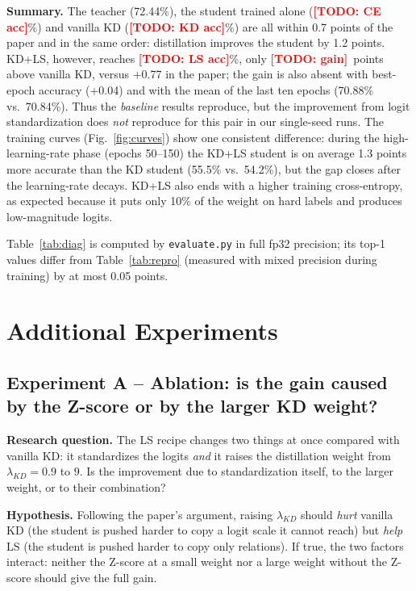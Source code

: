 \documentclass[12pt,a4paper]{article}
\newcommand{\TODO}[1]{\textcolor{red}{\textbf{[TODO: #1]}}}
\newcommand{\KDacc}{\TODO{KD acc}}
\newcommand{\LSacc}{\TODO{LS acc}}
\newcommand{\CEacc}{\TODO{CE acc}}
\newcommand{\LSgain}{\TODO{gain}}
\begin{document}
\textbf{Summary.} The teacher (72.44\%), the student trained alone (\CEacc\%) and vanilla KD (\KDacc\%) are all within 0.7 points of the paper and in the same order: distillation improves the student by 1.2 points. KD+LS, however, reaches \LSacc\%, only \LSgain\ points above vanilla KD, versus +0.77 in the paper; the gain is also absent with best-epoch accuracy (+0.04) and with the mean of the last ten epochs (70.88\% vs.\ 70.84\%). Thus the \emph{baseline} results reproduce, but the improvement from logit standardization does \emph{not} reproduce for this pair in our single-seed runs. The training curves (Fig.~\ref{fig:curves}) show one consistent difference: during the high-learning-rate phase (epochs 50--150) the KD+LS student is on average 1.3 points more accurate than the KD student (55.5\% vs.\ 54.2\%), but the gap closes after the learning-rate decays. KD+LS also ends with a higher training cross-entropy, as expected because it puts only 10\% of the weight on hard labels and produces low-magnitude logits.

Table~\ref{tab:diag} is computed by \texttt{evaluate.py} in full fp32 precision; its top-1 values differ from Table~\ref{tab:repro} (measured with mixed precision during training) by at most 0.05 points.

\section{Additional Experiments}
\label{sec:exp}

\subsection{Experiment A -- Ablation: is the gain caused by the Z-score or by the larger KD weight?}
\textbf{Research question.} The LS recipe changes two things at once compared with vanilla KD: it standardizes the logits \emph{and} it raises the distillation weight from $\lambda_{KD}=0.9$ to $9$. Is the improvement due to standardization itself, to the larger weight, or to their combination?

\textbf{Hypothesis.} Following the paper's argument, raising $\lambda_{KD}$ should \emph{hurt} vanilla KD (the student is pushed harder to copy a logit scale it cannot reach) but \emph{help} LS (the student is pushed harder to copy only relations). If true, the two factors interact: neither the Z-score at a small weight nor a large weight without the Z-score should give the full gain.
\end{document}
